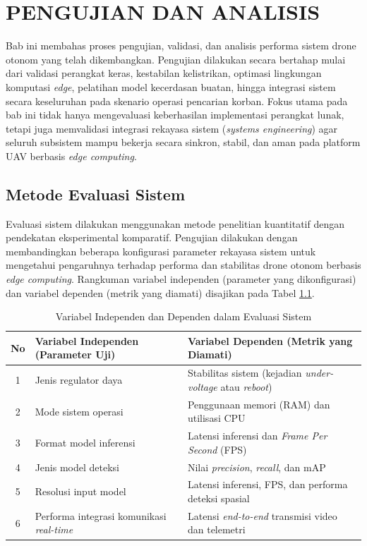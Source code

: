 \chapter{PENGUJIAN DAN ANALISIS}
\label{chap:bab4}

\setlength{\textfloatsep}{12pt plus 2pt minus 4pt}
\setlength{\floatsep}{10pt plus 2pt minus 2pt}
\setlength{\intextsep}{12pt plus 2pt minus 4pt}

Bab ini membahas proses pengujian, validasi, dan analisis performa sistem drone otonom yang telah dikembangkan.
Pengujian dilakukan secara bertahap mulai dari validasi perangkat keras, kestabilan kelistrikan, optimasi lingkungan komputasi \textit{edge}, pelatihan model kecerdasan buatan, hingga integrasi sistem secara keseluruhan pada skenario operasi pencarian korban.
Fokus utama pada bab ini tidak hanya mengevaluasi keberhasilan implementasi perangkat lunak, tetapi juga memvalidasi integrasi rekayasa sistem (\textit{systems engineering}) agar seluruh subsistem mampu bekerja secara sinkron, stabil, dan aman pada platform UAV berbasis \textit{edge computing}.

\section{Metode Evaluasi Sistem}

Evaluasi sistem dilakukan menggunakan metode penelitian kuantitatif dengan pendekatan eksperimental komparatif.
Pengujian dilakukan dengan membandingkan beberapa konfigurasi parameter rekayasa sistem untuk mengetahui pengaruhnya terhadap performa dan stabilitas drone otonom berbasis \textit{edge computing}.
Rangkuman variabel independen (parameter yang dikonfigurasi) dan variabel dependen (metrik yang diamati) disajikan pada Tabel \ref{tab:variabel_evaluasi}.

\begin{table}[H]
	\centering
	\caption{Variabel Independen dan Dependen dalam Evaluasi Sistem}
	\label{tab:variabel_evaluasi}
	\renewcommand{\arraystretch}{1.2}
	\begin{tabular}{|c|p{7cm}|p{7cm}|}
		\hline
		\textbf{No} & \textbf{Variabel Independen (Parameter Uji)} & \textbf{Variabel Dependen (Metrik yang Diamati)} \\ \hline
		1 & Jenis regulator daya & Stabilitas sistem (kejadian \textit{under-voltage} atau \textit{reboot}) \\ \hline
		2 & Mode sistem operasi & Penggunaan memori (RAM) dan utilisasi CPU \\ \hline
		3 & Format model inferensi & Latensi inferensi dan \textit{Frame Per Second} (FPS) \\ \hline
		4 & Jenis model deteksi & Nilai \textit{precision}, \textit{recall}, dan mAP \\ \hline
		5 & Resolusi input model & Latensi inferensi, FPS, dan performa deteksi spasial \\ \hline
		6 & Performa integrasi komunikasi \textit{real-time} & Latensi \textit{end-to-end} transmisi video dan telemetri \\ \hline
	\end{tabular}
\end{table}

